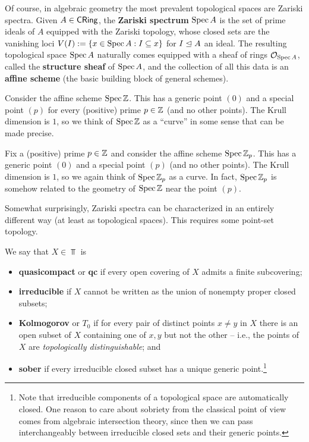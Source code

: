 \documentclass[11pt]{article}
\begin{document}
Of course, in algebraic geometry the most prevalent topological spaces are Zariski spectra. Given $A\in\operatorname{\mathsf{CRing}}$, the \textbf{Zariski spectrum} $\operatorname{Spec} A$ is the set of prime ideals of $A$ equipped with the Zariski topology, whose closed sets are the vanishing loci $V(I):=\{x\in\operatorname{Spec} A : I\subseteq x\}$ for $I\trianglelefteq A$ an ideal. The resulting topological space $\operatorname{Spec} A$ naturally comes equipped with a sheaf of rings $\mathcal{O}_{\operatorname{Spec} A}$, called the \textbf{structure sheaf} of $\operatorname{Spec} A$, and the collection of all this data is an 
\textbf{affine scheme} (the basic building block of general schemes). 

\begin{example}
Consider the affine scheme $\operatorname{Spec}\mathbb{Z}$. This has a generic point $(0)$ and a special point $(p)$ for every (positive) prime $p\in\mathbb{Z}$ (and no other points). The Krull dimension is $1$, so we think of $\operatorname{Spec}\mathbb{Z}$ as a ``curve'' in some sense that can be made precise.
\end{example}

\begin{example}
Fix a (positive) prime $p\in\mathbb{Z}$ and consider the affine scheme $\operatorname{Spec}\mathbb{Z}_p$. This has a generic point $(0)$ and a special point $(p)$ (and no other points). The Krull dimension is $1$, so we again think of $\operatorname{Spec}\mathbb{Z}_p$ as a curve. In fact, $\operatorname{Spec}\mathbb{Z}_p$ is somehow related to the geometry of $\operatorname{Spec}\mathbb{Z}$ near the point $(p)$.
\end{example}

Somewhat surprisingly, Zariski spectra can be characterized in an entirely different way (at least as topological spaces). This requires some point-set topology.

\begin{definition}
We say that $X\in\Top$ is 
\begin{itemize}
\item \textbf{quasicompact} or \textbf{qc} if every open covering of $X$ admits a finite subcovering;

\item \textbf{irreducible} if $X$ cannot be written as the union of nonempty proper closed subsets;

\item \textbf{Kolmogorov} or \textbf{$T_0$} if for every pair of distinct points $x\neq y$ in $X$ there is an open subset of $X$ containing one of $x,y$ but not the other -- i.e., the points of $X$ are \emph{topologically distinguishable}; and

\item \textbf{sober} if every irreducible closed subset has a unique generic point.\footnote{Note that irreducible components of a topological space are automatically closed. One reason to care about sobriety from the classical point of view comes from algebraic intersection theory, since then we can pass interchangeably between irreducible closed sets and their generic points.}
\end{itemize}
\end{definition}
\end{document}
